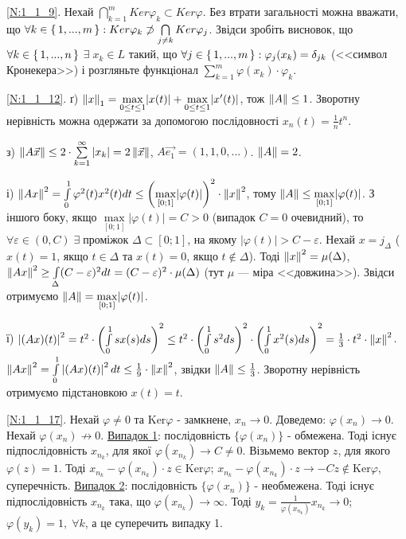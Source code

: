 
\noindent\ref{N:1_1_9}. Нехай $\bigcap\limits_{k=1}^m {Ker} \varphi_k \subset {Ker}\varphi$.
Без втрати загальності можна вважати, що $\forall k \in \set{1, ..., m}: {Ker} \varphi_k \not\supset \bigcap\limits_{j \neq k} {Ker} \varphi_j$.
Звідси зробіть висновок, що
$\forall k \in \set{1, ..., n}$ $\exists \; x_k \in L$
такий, що $\forall j \in \set{1, ..., m} : \varphi_j(x_k) = \delta_{jk}$ (<<символ Кронекера>>)
і розгляньте функціонал $\sum\limits_{k=1}^m \varphi(x_k) \cdot \varphi_k$.

\noindent\ref{N:1_1_12}.
ґ) $\left\lVert x\right\rVert_1 = \underset{0\leq t \leq 1}{\max} |x(t)| + \underset{0\leq t \leq 1}{\max} |x'(t)|$, тож $\left\lVert A\right\rVert \leq 1$.
Зворотну нерівність можна одержати за допомогою послідовності $x_n(t) = \frac{1}{n} t^n$.

\noindent з) $\left\lVert A\vec{x}\right\rVert \leq 2 \cdot \sum\limits_{k=1}^{\infty} |x_k| = 2 \left\lVert\vec{x}\right\rVert$, $A \vec{e_1} = (1, 1, 0, ...)$. $\left\lVert A\right\rVert = 2$.

\noindent і) $\left\lVert Ax\right\rVert^2 = \int\limits_0^1 \varphi^2 (t) x^2(t) dt \leq \left(\underset{[0;1]}{\max} |\varphi(t)|\right)^2 \cdot \left\lVert x\right\rVert^2 $, 
тому $\left\lVert A\right\rVert \leq \underset{[0;1]}{\max} |\varphi(t)|$.
З іншого боку, якщо $\underset{[0;1]}{\max} |\varphi(t)| = C > 0$ (випадок $C = 0$ очевидний), то
$\forall \varepsilon \in (0, C) \; \exists \; \text{проміжок } \Delta \subset [0;1]$,
на якому $|\varphi(t)| > C - \varepsilon$. Нехай $x = j_\Delta$ ($x(t) = 1$, якщо $t \in \Delta$ та $x(t) = 0$, якщо $t \notin \Delta$).
Тоді $\left\lVert x\right\rVert^2 = \mu(\Delta)$, $\left\lVert Ax\right\rVert^2 \geq \int\limits_\Delta (C-\varepsilon)^2 dt = (C-\varepsilon)^2 \cdot \mu(\Delta)$ (тут $\mu$ --- міра <<довжина>>).
Звідси отримуємо $\left\lVert A\right\rVert = \underset{[0;1]}{\max} |\varphi(t)|$.

\noindent ї) $\left| (Ax)(t) \right|^2 = t^2 \cdot \left( \int\limits_0^1 s x(s) ds\right)^2 \leq t^2 \cdot \left( \int\limits_0^1 s^2 ds\right)^2 \cdot \left( \int\limits_0^1 x^2(s) ds\right)^2 = \frac{1}{3} \cdot t^2 \cdot \left\lVert x\right\rVert^2$.
$\left\lVert Ax\right\rVert^2 = \int\limits_0^1 \left| (Ax)(t) \right|^2 dt \leq \frac{1}{9} \cdot \left\lVert x\right\rVert^2$, звідки $\left\lVert A\right\rVert \leq \frac{1}{3}$.
Зворотну нерівність отримуємо підстановкою $x(t) = t$.

\noindent\ref{N:1_1_17}. Нехай $\varphi \neq 0$ та $\mathrm{Ker}\varphi$ - замкнене,
$x_n \to 0$. Доведемо: $\varphi(x_n) \to 0$. Нехай $\varphi(x_n) \not\to 0$.
\uline{Випадок 1}: послідовність $\{\varphi(x_n)\}$ - обмежена. Тоді існує підпослідовність
$x_{n_k}$, для якої $\varphi(x_{n_k}) \to C \neq 0$. Візьмемо вектор $z$, для якого
$\varphi(z) = 1$. Тоді $x_{n_k} - \varphi(x_{n_k})\cdot z \in \mathrm{Ker}\varphi$;
$x_{n_k} - \varphi(x_{n_k})\cdot z \to - Cz \notin \mathrm{Ker}\varphi$, суперечність.
\uline{Випадок 2}: послідовність $\{\varphi(x_n)\}$ - необмежена. Тоді існує
підпослідовність $x_{n_k}$ така, що $\varphi(x_{n_k}) \to \infty$. Тоді 
$y_k = \frac{1}{\varphi(x_{n_k})}x_{n_k} \to 0$; $\varphi(y_k)=1, \; \forall k$,
а це суперечить випадку 1.

